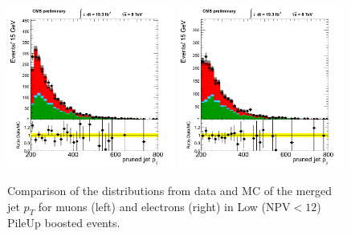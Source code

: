 \begin{figure}[h!t]
  {\centering
    \includegraphics[width=0.49\textwidth]{figs/puchecks/mu_LowNPV_GroomedJet_pt_pr.png}
    \includegraphics[width=0.49\textwidth]{figs/puchecks/el_LowNPV_GroomedJet_pt_pr.png}
    \caption{Comparison of the distributions from data and MC of the
    merged jet $p_T$ for muons (left) and electrons (right)
    in Low (NPV$<12$) PileUp boosted events.}
\label{fig:pu_mergedjetptLow}}
\end{figure}
